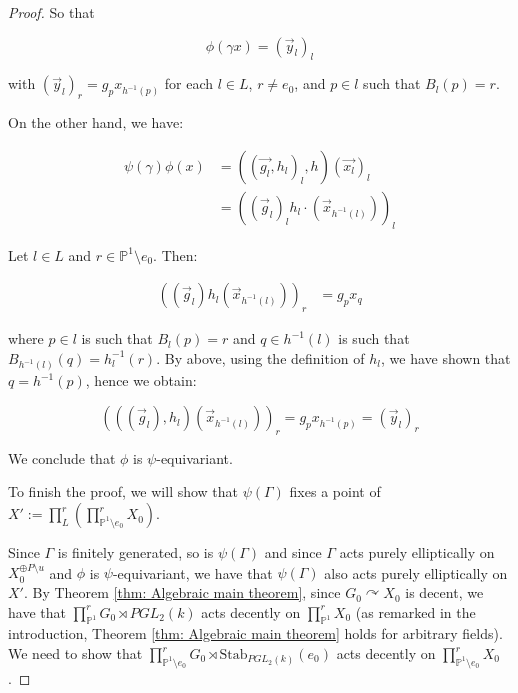 \documentclass[12pt]{article}
\theoremstyle{definition}
\begin{document}
\begin{proof}
    So that 

    $$\phi(\gamma x) = (\vec{y}_{l})_l$$

    with $(\vec{y}_{l})_r = g_p x_{h^{-1}(p)}$ for each $l \in L$, $r \neq e_0$, and $p \in l$ such that $B_{l}(p) = r$.

    On the other hand, we have: 

    \begin{align*}
        \psi(\gamma) \phi(x) &= ((\vec{g_l}, h_l)_l, h)(\vec{x_{l}})_l \\
        &= ((\vec{g}_l)_l h_l \cdot(\vec{x}_{h^{-1}(l)}))_l
    \end{align*}

    Let $l \in L$ and $r \in \mathbb{P}^1 \setminus e_0$. Then:

    \begin{align*}
        ((\vec{g}_l)h_l (\vec{x}_{h^{-1}(l)}))_r 
        &= g_p x_q
    \end{align*}

    where $p \in l$ is such that $B_{l}(p) = r$ and $q \in h^{-1}(l)$ is such that $B_{h^{-1}(l)}(q) = h_{l}^{-1}(r)$. By above, using the definition of $h_{l}$, we have shown that $q=h^{-1}(p)$, hence we obtain: 

    $$(((\vec{g}_l), h_{l}) (\vec{x}_{h^{-1}(l)}))_r = g_p x_{h^{-1}(p)} = (\vec{y}_{l})_r$$

    We conclude that $\phi$ is $\psi$-equivariant. 

    To finish the proof, we will show that $\psi(\Gamma)$ fixes a point of $X':=\prod_L^r (\prod_{\mathbb{P}^1 \setminus e_0}^r X_0)$. 

    Since $\Gamma$ is finitely generated, so is $\psi(\Gamma)$ and since $\Gamma$ acts purely elliptically on $X_0^{\oplus P \setminus u}$ and $\phi$ is $\psi$-equivariant, we have that $\psi(\Gamma)$ also acts purely elliptically on $X'$. By Theorem \ref{thm: Algebraic main theorem}, since $G_0 \curvearrowright X_0$ is decent, we have that $\prod_{\mathbb{P}^1}^rG_0 \rtimes PGL_2(k)$ acts decently on $\prod_{\mathbb{P}^1}^rX_0$ (as remarked in the introduction, Theorem \ref{thm: Algebraic main theorem} holds for arbitrary fields). We need to show that $\prod_{\mathbb{P}^1 \setminus e_0}^rG_0 \rtimes \mathrm{Stab}_{PGL_2(k)}(e_0)$ acts decently on $\prod_{\mathbb{P}^1 \setminus e_0}^rX_0$. 
    

\end{proof}
\end{document}
